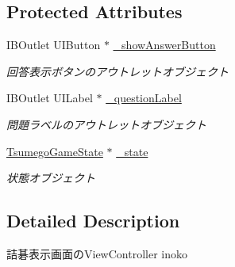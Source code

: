 \subsection*{Protected Attributes}
\begin{DoxyCompactItemize}
\item 
\hypertarget{interface_tsumego_show_view_controller_a85b4635986bef0839198b33c8b073e54}{
IBOutlet UIButton $\ast$ \hyperlink{interface_tsumego_show_view_controller_a85b4635986bef0839198b33c8b073e54}{\_\-showAnswerButton}}
\label{interface_tsumego_show_view_controller_a85b4635986bef0839198b33c8b073e54}

\begin{DoxyCompactList}\small\item\em 回答表示ボタンのアウトレットオブジェクト \end{DoxyCompactList}\item 
\hypertarget{interface_tsumego_show_view_controller_a65d53e8ff2038f00eeea1554c9b21b2f}{
IBOutlet UILabel $\ast$ \hyperlink{interface_tsumego_show_view_controller_a65d53e8ff2038f00eeea1554c9b21b2f}{\_\-questionLabel}}
\label{interface_tsumego_show_view_controller_a65d53e8ff2038f00eeea1554c9b21b2f}

\begin{DoxyCompactList}\small\item\em 問題ラベルのアウトレットオブジェクト \end{DoxyCompactList}\item 
\hypertarget{interface_tsumego_show_view_controller_a1e747e05b5a6d7a416269eceb341117e}{
\hyperlink{interface_tsumego_game_state}{TsumegoGameState} $\ast$ \hyperlink{interface_tsumego_show_view_controller_a1e747e05b5a6d7a416269eceb341117e}{\_\-state}}
\label{interface_tsumego_show_view_controller_a1e747e05b5a6d7a416269eceb341117e}

\begin{DoxyCompactList}\small\item\em 状態オブジェクト \end{DoxyCompactList}\end{DoxyCompactItemize}


\subsection{Detailed Description}
詰碁表示画面のViewController  inoko 

